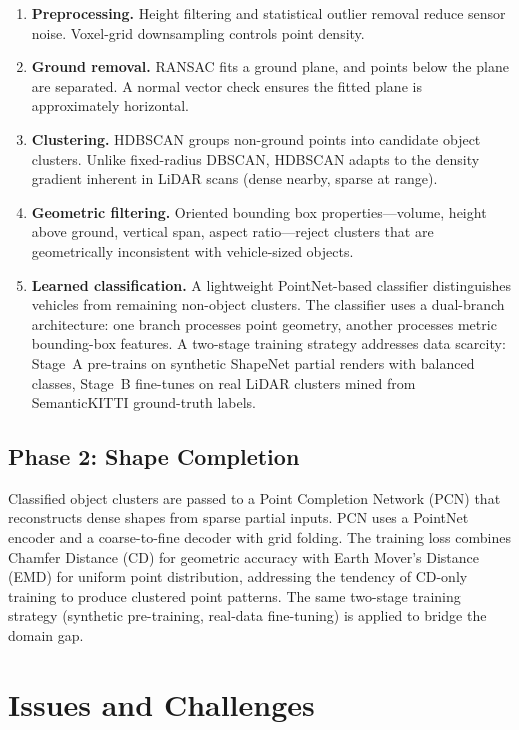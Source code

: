 \documentclass[runningheads]{llncs}
\begin{document}
\begin{enumerate}
    \item \textbf{Preprocessing.} Height filtering and statistical outlier removal reduce sensor noise. Voxel-grid downsampling controls point density.
    \item \textbf{Ground removal.} RANSAC fits a ground plane, and points below the plane are separated. A normal vector check ensures the fitted plane is approximately horizontal.
    \item \textbf{Clustering.} HDBSCAN groups non-ground points into candidate object clusters. Unlike fixed-radius DBSCAN, HDBSCAN adapts to the density gradient inherent in LiDAR scans (dense nearby, sparse at range).
    \item \textbf{Geometric filtering.} Oriented bounding box properties---volume, height above ground, vertical span, aspect ratio---reject clusters that are geometrically inconsistent with vehicle-sized objects.
    \item \textbf{Learned classification.} A lightweight PointNet-based classifier distinguishes vehicles from remaining non-object clusters. The classifier uses a dual-branch architecture: one branch processes point geometry, another processes metric bounding-box features. A two-stage training strategy addresses data scarcity: Stage~A pre-trains on synthetic ShapeNet partial renders with balanced classes, Stage~B fine-tunes on real LiDAR clusters mined from SemanticKITTI ground-truth labels.
\end{enumerate}

\subsection{Phase 2: Shape Completion}

Classified object clusters are passed to a Point Completion Network (PCN) that reconstructs dense shapes from sparse partial inputs. PCN uses a PointNet encoder and a coarse-to-fine decoder with grid folding. The training loss combines Chamfer Distance (CD) for geometric accuracy with Earth Mover's Distance (EMD) for uniform point distribution, addressing the tendency of CD-only training to produce clustered point patterns. The same two-stage training strategy (synthetic pre-training, real-data fine-tuning) is applied to bridge the domain gap.


\section{Issues and Challenges}
\end{document}
